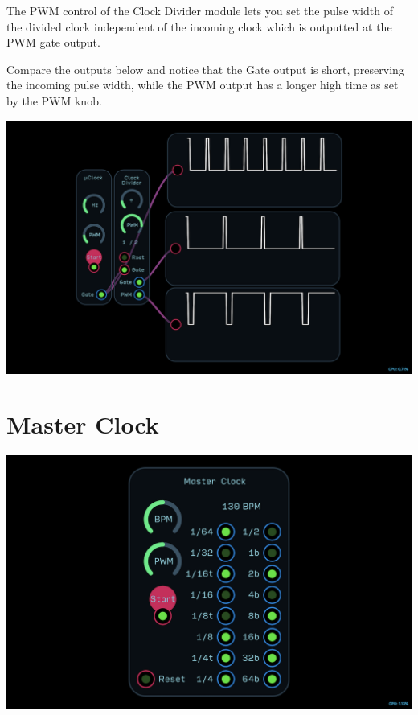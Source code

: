 \documentclass[11pt]{book}
\begin{document}
\begin{multicols*}{2}
The PWM control of the Clock Divider module lets you set the pulse width of the divided clock independent of the incoming clock which is outputted at the PWM gate output.

Compare the outputs below and notice that the Gate output is short, preserving the incoming pulse width, while the PWM output has a longer high time as set by the PWM knob.

\begin{center}
\includegraphics[width=0.95\linewidth]{clock-divider-fig3.png}
\end{center}



\end{multicols*}


\pagebreak


\section{Master Clock}

\includegraphics[width=\textwidth]{master-clock.png}
\end{document}
